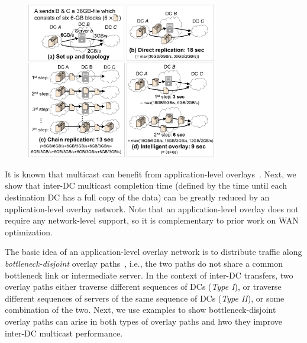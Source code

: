 \begin{figure}[t]
\centering
\includegraphics[width=84mm]{images/example-2.pdf}
\vspace{-0.4cm}
\label{fig:case:example}
\vspace{-0.4cm}
\end{figure}

It is known that multicast can benefit from application-level 
overlays~\cite{chu2000case}. Next, we show that inter-DC multicast
completion time (defined by the time until each destination DC has
a full copy of the data) can be greatly reduced by an 
application-level overlay network. Note that an application-level 
overlay does not require any network-level support, so it is 
complementary to prior work on WAN optimization.

The basic idea of an application-level overlay network is to 
distribute traffic along {\em bottleneck-disjoint} overlay 
paths~\cite{datta19951}, i.e., the two paths do not share a common
bottleneck link or intermediate server.
In the context of inter-DC transfers, two overlay paths either 
traverse different sequences of DCs ({\em Type I}), or
traverse different sequences of servers of the same sequence of 
DCs ({\em Type II}), or some combination of the two. 
Next, we use examples to show bottleneck-disjoint overlay paths can 
arise in both types of overlay paths and hwo they improve inter-DC 
multicast performance.

